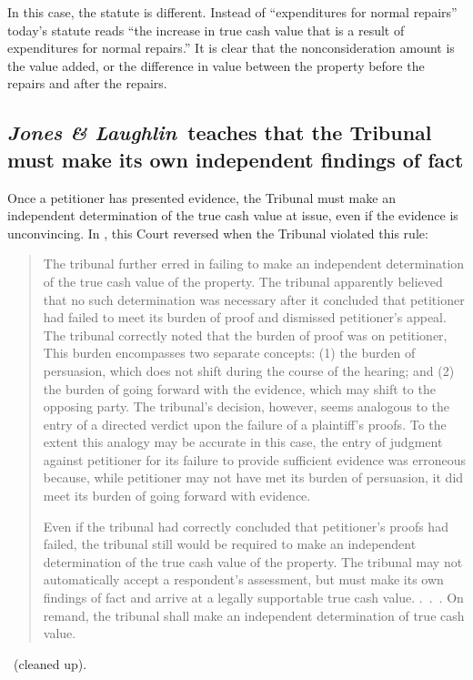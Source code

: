 \documentclass[12pt,\documentclassflag]{michiganCourtOfAppealsBrief}
\begin{document}
In this case, the statute is different. Instead of ``expenditures for normal repairs'' today's statute reads ``the increase in true cash value that is a result of expenditures for normal repairs.'' It is clear that the nonconsideration amount is the value added, or the difference in value between the property before the repairs and after the repairs.

\subsection{\emph{Jones & Laughlin}\ teaches that the Tribunal must make its own independent findings of fact}

Once a petitioner has presented evidence, the Tribunal must make an independent determination of the true cash value at issue, even if the evidence is unconvincing. In \cite[s]{Jones & Laughlin}, this Court reversed when the Tribunal violated this rule:

\begin{quotation}
The tribunal further erred in failing to make an independent determination of the true cash value of the property. The tribunal apparently believed that no such determination was necessary after it concluded that petitioner had failed to meet its burden of proof and dismissed petitioner's appeal. The tribunal correctly noted that the burden of proof was on petitioner, This burden encompasses two separate concepts: (1) the burden of persuasion, which does not shift during the course of the hearing; and (2) the burden of going forward with the evidence, which may shift to the opposing party. The tribunal's decision, however, seems analogous to the entry of a directed verdict upon the failure of a plaintiff's proofs. To the extent this analogy may be accurate in this case, the entry of judgment against petitioner for its failure to provide sufficient evidence was erroneous because, while petitioner may not have met its burden of persuasion, it did meet its burden of going forward with evidence.
	
Even if the tribunal had correctly concluded that petitioner's proofs had failed, the tribunal still would be required to make an independent determination of the true cash value of the property. The tribunal may not automatically accept a respondent's assessment, but must make its own findings of fact and arrive at a legally supportable true cash value. .~.~. On remand, the tribunal shall make an independent determination of true cash value.
\end{quotation}
\ (cleaned up).
\end{document}
